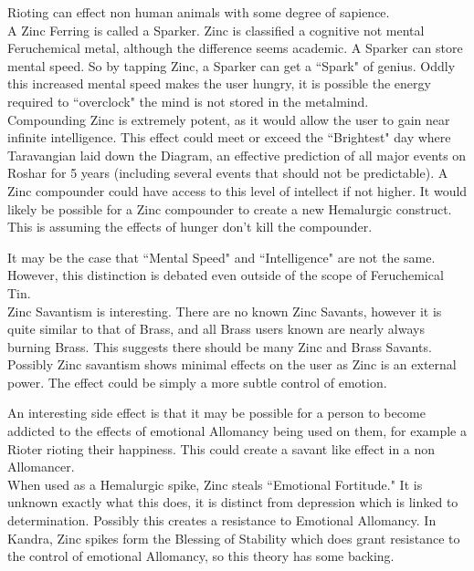 \documentclass[conference]{IEEEtran}
\begin{document}
Rioting can effect non human animals with some degree of sapience.\cite{riot-animal}\\

A Zinc Ferring is called a Sparker.\cite{ARS}  Zinc is classified a cognitive not mental Feruchemical metal, although the difference seems academic.\cite{FE-TB}  A Sparker can store mental speed.  So by tapping Zinc, a Sparker can get a ``Spark" of genius.\cite{ARS}  Oddly this increased mental speed makes the user hungry,\cite{BoM-CH3} it is possible the energy required to ``overclock" the mind is not stored in the metalmind.\\

Compounding Zinc is extremely potent, as it would allow the user to gain near infinite intelligence.  This effect could meet or exceed the ``Brightest" day where Taravangian laid down the Diagram, an effective prediction of all major events on Roshar for 5 years (including several events that should not be predictable).\cite{WoR}\cite{OB-CH122}  A Zinc compounder could have access to this level of intellect if not higher.  It would likely be possible for a Zinc compounder to create a new Hemalurgic construct.  This is assuming the effects of hunger don't kill the compounder.

It may be the case that ``Mental Speed" and ``Intelligence" are not the same.\cite{MSI-N}  However, this distinction is debated even outside of the scope of Feruchemical Tin.\cite{MSI-P1}\cite{MSI-P2}\cite{MSI-P3}
\\

Zinc Savantism is interesting.  There are no known Zinc Savants,\cite{WoF} however it is quite similar to that of Brass, and all Brass users known are nearly always burning Brass.\cite{WoA-CH11}  This suggests there should be many Zinc and Brass Savants.  Possibly Zinc savantism shows minimal effects on the user as Zinc is an external power.  The effect could be simply a more subtle control of emotion.

An interesting side effect is that it may be possible for a person to become addicted to the effects of emotional Allomancy being used on them, for example a Rioter rioting their happiness.  This could create a savant like effect in a non Allomancer. \\

When used as a Hemalurgic spike, Zinc steals ``Emotional Fortitude."\cite{HE-TB} It is unknown exactly what this does, it is distinct from depression which is linked to determination. \cite{ARS}  Possibly this creates a resistance to Emotional Allomancy.  In Kandra, Zinc spikes form the Blessing of Stability\cite{Bless-stable} which does grant resistance to the control of emotional Allomancy,\cite{WoA-CH54}\cite{WoA-CH40} so this theory has some backing.\\
\end{document}

